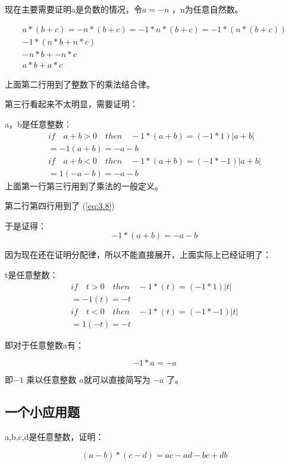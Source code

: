 \documentclass[12pt,oneside]{book}
\begin{document}
现在主要需要证明a是负数的情况，令$a=-n$ ，n为任意自然数。

\begin{align*}
a*(b+c) = -n*(b+c) = -1*n*(b+c) = -1*(n * (b+c))\\
-1 * (n*b+n*c)\\
-n*b + -n*c\\
a*b + a*c
\end{align*}

上面第二行用到了整数下的乘法结合律。

第三行看起来不太明显，需要证明：

a，b是任意整数：
\begin{align*}
if \quad a+b > 0 \quad then \quad -1 * (a+b) = (-1*1)|a+b|\\
= -1(a+b) = -a - b \\
if \quad a+b <0  \quad then \quad -1 * (a+b) = (-1*-1)|a+b|\\ 
= 1(-a-b) = -a-b
\end{align*}
上面第一行第三行用到了乘法的一般定义。

第二行第四行用到了 (\ref{eq:3.8})

于是证得：
\begin{equation}
\label{eq:4.10}
-1 * (a+b) = -a -b
\end{equation}

因为现在还在证明分配律，所以不能直接展开，上面实际上已经证明了：

t是任意整数：
\begin{align*}
if \quad t > 0 \quad then \quad -1 * (t) = (-1*1)|t|\\
= -1(t) = -t \\
if \quad t <0  \quad then \quad -1 * (t) = (-1*-1)|t|\\ 
= 1(-t) = -t
\end{align*}

即对于任意整数a有：

\begin{equation}
\label{eq:4.11}
-1 * a = -a
\end{equation}

即$-1$ 乘以任意整数 $a$就可以直接简写为 $-a$ 了。

\subsection{一个小应用题}
a,b,c,d是任意整数，证明：

\begin{equation}
(a-b) * (c-d) = ac - ad - bc +db 
\end{equation}
\end{document}
